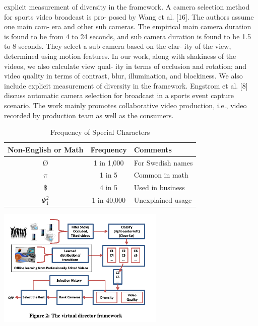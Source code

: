 \documentclass{sig-alternate}
\begin{document}
	explicit measurement of diversity in the framework.
	A camera selection method for sports video broadcast is pro-
	posed by Wang et al. [16]. The authors assume one main cam-
	era and other sub cameras. The empirical main camera duration is
	found to be from 4 to 24 seconds, and sub camera duration is found
	to be 1.5 to 8 seconds. They select a sub camera based on the clar-
	ity of the view, determined using motion features. In our work,
	along with shakiness of the videos, we also calculate view qual-
	ity in terms of occlusion and rotation; and video quality in terms
	of contrast, blur, illumination, and blockiness. We also include
	explicit measurement of diversity in the framework. Engstrom et
	al. [8] discuss automatic camera selection for broadcast in a sports
	event capture scenario. The work mainly promotes collaborative
	video production, i.e., video recorded by production team as well
	as the consumers.
	
	\begin{table}
		\caption{Frequency of Special Characters}
		\begin{tabular}{|c|c|l|} \hline
			Non-English or Math&Frequency&Comments\\ \hline
			\O & 1 in 1,000& For Swedish names\\ \hline
			$\pi$ & 1 in 5& Common in math\\ \hline
			\$ & 4 in 5 & Used in business\\ \hline
			$\Psi^2_1$ & 1 in 40,000& Unexplained usage\\
			\hline\end{tabular}
	\end{table}
	
	\includegraphics[width=8cm]{b.png}
	
\end{document}
